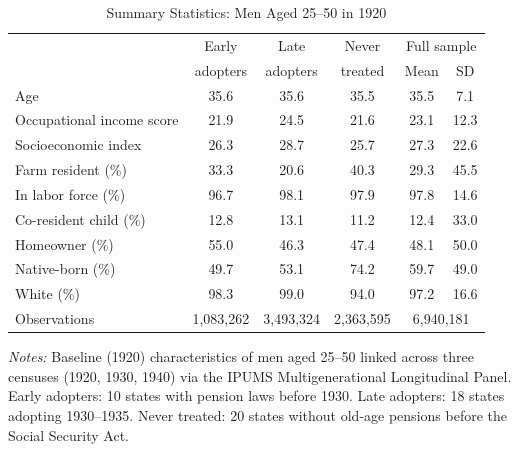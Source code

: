 \begin{table}[H]
\centering
\caption{Summary Statistics: Men Aged 25--50 in 1920}
\label{tab:summary}
\begin{threeparttable}
\begin{tabular}{lccccc}
\toprule
 & Early & Late & Never & \multicolumn{2}{c}{Full sample} \\
 & adopters & adopters & treated & Mean & SD \\
\midrule
Age & 35.6 & 35.6 & 35.5 & 35.5 & 7.1 \\
Occupational income score & 21.9 & 24.5 & 21.6 & 23.1 & 12.3 \\
Socioeconomic index & 26.3 & 28.7 & 25.7 & 27.3 & 22.6 \\
Farm resident (\%) & 33.3 & 20.6 & 40.3 & 29.3 & 45.5 \\
In labor force (\%) & 96.7 & 98.1 & 97.9 & 97.8 & 14.6 \\
Co-resident child (\%) & 12.8 & 13.1 & 11.2 & 12.4 & 33.0 \\
Homeowner (\%) & 55.0 & 46.3 & 47.4 & 48.1 & 50.0 \\
Native-born (\%) & 49.7 & 53.1 & 74.2 & 59.7 & 49.0 \\
White (\%) & 98.3 & 99.0 & 94.0 & 97.2 & 16.6 \\
\midrule
Observations & 1,083,262 & 3,493,324 & 2,363,595 & \multicolumn{2}{c}{6,940,181} \\
\bottomrule
\end{tabular}
\begin{tablenotes}[flushleft]\small
\item \textit{Notes:} Baseline (1920) characteristics of men aged 25--50 linked across three censuses (1920, 1930, 1940) via the IPUMS Multigenerational Longitudinal Panel. Early adopters: 10 states with pension laws before 1930. Late adopters: 18 states adopting 1930--1935. Never treated: 20 states without old-age pensions before the Social Security Act.
\end{tablenotes}
\end{threeparttable}
\end{table}

